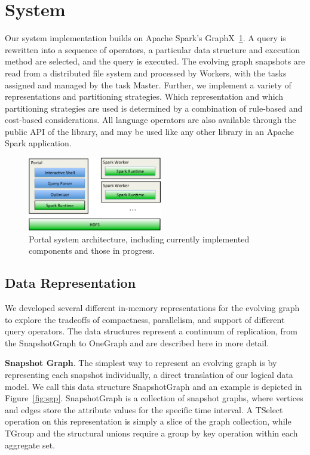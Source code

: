 \section{System}
\label{sec:sys}

Our \ql system implementation builds on Apache Spark's
GraphX~\ref{fig:arch}.  A \ql query is rewritten into a sequence of
operators, a particular data structure and execution method are
selected, and the query is executed.  The evolving graph snapshots are
read from a distributed file system and processed by Workers, with the
tasks assigned and managed by the task Master.  
Further, we implement a variety of \tg representations and
partitioning strategies.  Which representation and which partitioning
strategies are used is determined by a combination of rule-based and
cost-based considerations.  All language operators are also available
through the public API of the \ql library, and may be used like any
other library in an Apache Spark application.

\begin{figure}[t!]
\includegraphics[width=2.3in]{figs/architecture.pdf}
\caption{Portal system architecture, including currently implemented
  components and those in progress.}
\label{fig:arch}
\end{figure}

\subsection{Data Representation}

We developed several different in-memory representations for the
evolving graph to explore the tradeoffs of compactness, parallelism,
and support of different query operators.  The data structures
represent a continuum of replication, from the SnapshotGraph to
OneGraph and are described here in more detail.

{\bf Snapshot Graph}. The simplest way to represent an evolving graph
is by representing each snapshot individually, a direct translation of
our logical data model.  We call this data structure SnapshotGraph and
an example is depicted in Figure~\ref{fig:sgp}.  SnapshotGraph is a
collection of snapshot graphs, where vertices and edges store the
attribute values for the specific time interval.  A TSelect operation
on this representation is simply a slice of the graph collection,
while TGroup and the structural unions require a group by key
operation within each aggregate set.

